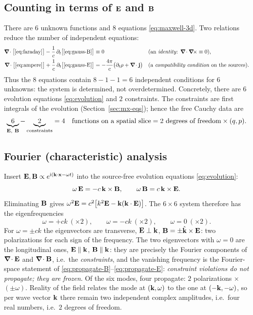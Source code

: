 \subsection{\texorpdfstring{Counting in terms of $\mathbf{E}$ and $\mathbf{B}$}{Counting in terms of E and B}}

There are $6$ unknown functions and $8$ equations \eqref{eq:maxwell-3d}.
Two relations reduce the number of independent equations:
\begin{align}
\boldsymbol{\nabla}\!\cdot\big[\text{\eqref{eq:faraday}}\big]-\frac1c\,\partial_t\big[\text{\eqref{eq:gauss-B}}\big]&\equiv0
&&\text{(an \emph{identity}: $\boldsymbol{\nabla}\!\cdot\boldsymbol{\nabla}\!\times\equiv0$),}\\
\boldsymbol{\nabla}\!\cdot\big[\text{\eqref{eq:ampere}}\big]+\frac1c\,\partial_t\big[\text{\eqref{eq:gauss-E}}\big]
&=-\frac{4\pi}{c}\big(\partial_t\rho+\boldsymbol{\nabla}\!\cdot\mathbf{j}\big)
&&\text{(a \emph{compatibility condition} on the sources).}
\end{align}
Thus the $8$ equations contain $8-1-1=6$ independent conditions for $6$
unknowns: the system is determined, not overdetermined.  Concretely,
there are $6$ evolution equations \eqref{eq:evolution} and $2$
constraints.  The constraints are first integrals of the evolution
(Section~\ref{sec:mx-eqs}); hence the free Cauchy data are
\begin{equation}
\underbrace{6}_{\vE,\ \vB}-\underbrace{2}_{\text{constraints}}=4
\quad\text{functions on a spatial slice}=2\ \text{degrees of freedom}\times(q,p).
\end{equation}

\subsection{Fourier (characteristic) analysis}

Insert $\mathbf{E},\mathbf{B}\propto e^{\mathrm{i}(\mathbf{k}\cdot\mathbf{x}-\omega t)}$ into the source-free
evolution equations \eqref{eq:evolution}:
\begin{equation}\label{eq:eigen}
\omega\,\mathbf{E}=-c\,\mathbf{k}\times\mathbf{B},\qquad \omega\,\mathbf{B}=c\,\mathbf{k}\times\mathbf{E} .
\end{equation}
Eliminating $\mathbf{B}$ gives $\omega^2\mathbf{E}=c^2\big[k^2\mathbf{E}-\mathbf{k}(\mathbf{k}\cdot\mathbf{E})\big]$.
The $6\times6$ system therefore has the eigenfrequencies
\begin{equation}
\omega=+ck\ (\times2),\qquad \omega=-ck\ (\times2),\qquad \omega=0\ (\times2).
\end{equation}
For $\omega=\pm ck$ the eigenvectors are transverse, $\mathbf{E}\perp\mathbf{k}$,
$\mathbf{B}=\pm\hat{\mathbf{k}}\times\mathbf{E}$: two polarizations for each sign of the
frequency.  The two eigenvectors with $\omega=0$ are the longitudinal
ones, $\mathbf{E}\parallel\mathbf{k}$, $\mathbf{B}\parallel\mathbf{k}$: they are precisely the
Fourier components of $\boldsymbol{\nabla}\!\cdot\mathbf{E}$ and $\boldsymbol{\nabla}\!\cdot\mathbf{B}$, i.e.\ the \emph{constraints},
and the vanishing frequency is the Fourier-space statement of
\eqref{eq:propagate-B}--\eqref{eq:propagate-E}: \emph{constraint
violations do not propagate; they are frozen}.  Of the six modes, four
propagate: $2$ polarizations $\times$ $(\pm\omega)$.  Reality of the
field relates the mode at $(\mathbf{k},\omega)$ to the one at
$(-\mathbf{k},-\omega)$, so per wave vector $\mathbf{k}$ there remain two independent
complex amplitudes, i.e.\ four real numbers, i.e.\ $2$ degrees of
freedom.

